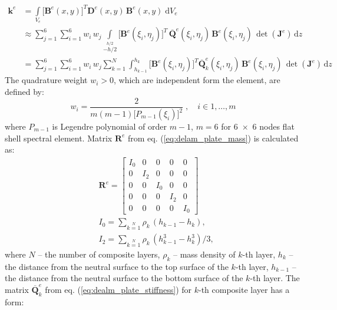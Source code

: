 \documentclass[preprint,12pt]{elsarticle}
\newcommand{\ud}{\mathrm{d}}
\renewcommand{\vec}[1]{\mathbf{#1}}
\renewcommand{\bm}[1]{\mathbf{#1}}
\begin{document}
	\begin{equation}
	\begin{split}
	\bm{k}^e &= \int \limits_{V_e} \big[\vec{B}^e\!(x,y)\big]^{\!T} \vec{D}^e \!(x,y)\, \vec{B}^e\!(x,y) \; \ud V_e \\
	& \approx \sum \limits_{j=1}^{6} \sum \limits_{i=1}^{6} w_i\, w_j\! \int \limits_{-h/2}\limits^{h/2} \big[\vec{B}^e\!(\xi_i,\eta_j)\big]^{\!T}\, \bm{\overline Q}^e\!(\xi_i,\eta_j) \, \vec{B}^e\!(\xi_i,\eta_j) \, \det(\vec{J}^e)\, \ud z\\
	&=\sum \limits_{j=1}^{6} \sum \limits_{i=1}^{6} w_i\, w_j \sum \limits_{k=1}^{N} \int_{h_{k-1}}^{h_k} \big[\vec{B}^e\!(\xi_i,\eta_j)\big]^{\!T} \bm{\overline Q}_k^e\!(\xi_i,\eta_j) \, \vec{B}^e\!(\xi_i,\eta_j) \, \det(\vec{J}^e)\, \ud z \label{eq:dealm_plate_stiffness}
	\end{split}
	\end{equation} 
	The quadrature weight $w_i > 0$, which are independent form the element, are defined by:
	\begin{equation}
	w_i = \frac{2}{m(m-1)\big[ P_{m-1}\!(\xi_i) \big]^2}\; , \quad i \in 1,\ldots, m \label{eq:weights}
	\end{equation}
	where $P_{m-1}$ is Legendre polynomial of order $m-1$, $m=6$ for 6~$\times$~6 nodes flat shell spectral element.
	Matrix $\bm{R}^e$ from eq. (\ref{eq:delam_plate_mass}) is calculated as:
	\begin{equation}
	\begin{split}
	&\bm{R}^e = \left[\begin{array}{ccccc} I_0 & 0&0&0&0 \\ 0& I_2&0&0&0 \\0&0&I_0&0&0\\0&0&0&I_2&0\\ 0&0&0&0&I_0 \end{array}\right]\\
	&I_0 =  \sum \limits_{k=1}\limits^{N} \rho_k \,(h_{k-1} - h_k),\\ 
	& I_2 =  \sum \limits_{k=1}\limits^{N} \rho_k \,(h_{k-1}^3 - h_k^3)/3,
	\label{eq:delam_plate_mass_dens}
	\end{split}
	\end{equation}
	where $N$ -- the number of composite layers, $\rho_k$ -- mass density of $k$-th layer, $h_k$ -- the distance from the neutral surface to the top surface of the $k$-th layer, $h_{k-1}$ -- the distance from the neutral surface to the bottom surface of the $k$-th layer.
	The matrix $\bm{\overline Q}_k^e$ from eq. (\ref{eq:dealm_plate_stiffness}) for $k$-th composite layer has a form:
\end{document}
